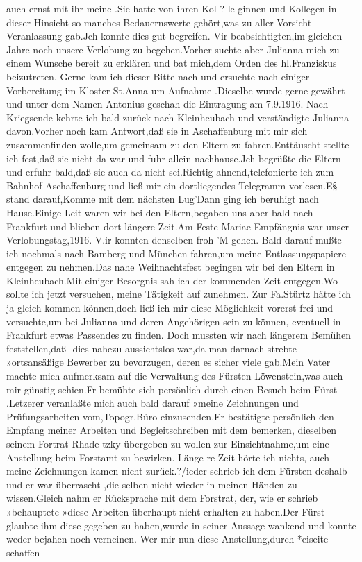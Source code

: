 \documentclass[a4paper,11pt]{article}
\begin{document}
 auch ernst mit ihr meine .Sie hatte von ihren Kol-? le ginnen und Kollegen in dieser Hinsicht so manches Bedauernswerte gehört,was zu aller Vorsicht Veranlassung gab.Jch konnte dies gut begreifen. Vir beabsichtigten,im gleichen Jahre noch unsere Verlobung zu begehen.Vorher suchte aber Julianna mich zu einem Wunsche bereit zu erklären und bat mich,dem Orden des hl.Franziskus beizutreten. Gerne kam ich dieser Bitte nach und ersuchte nach einiger Vorbereitung im Kloster St.Anna um Aufnahme .Dieselbe wurde gerne gewährt und unter dem Namen Antonius geschah die Eintragung am 7.9.1916. Nach Kriegsende kehrte ich bald zurück nach Kleinheubach und verständigte Julianna davon.Vorher noch kam Antwort,daß sie in Aschaffenburg mit mir sich zusammenfinden wolle,um gemeinsam zu den Eltern zu fahren.Enttäuscht stellte ich fest,daß sie nicht da war und fuhr allein nachhause.Jch begrüßte die Eltern und erfuhr bald,daß sie auch da nicht sei.Richtig ahnend,telefonierte ich zum Bahnhof Aschaffenburg und ließ mir ein dortliegendes Telegramm vorlesen.E§ stand darauf,Komme mit dem nächsten Lug'Dann ging ich beruhigt nach Hause.Einige Leit waren wir bei den Eltern,begaben uns aber bald nach Frankfurt und blieben dort längere Zeit.Am Feste Mariae Empfängnis war unser Verlobungstag,1916. V.ir konnten denselben froh 'M gehen. Bald darauf mußte ich nochmals nach Bamberg und München fahren,um meine Entlassungspapiere entgegen zu nehmen.Das nahe Weihnachtsfest begingen wir bei den Eltern in Kleinheubach.Mit einiger Besorgnis sah ich der kommenden Zeit entgegen.Wo sollte ich jetzt versuchen, meine Tätigkeit auf zunehmen. Zur Fa.Stürtz hätte ich ja gleich kommen können,doch ließ ich mir diese Möglichkeit vorerst frei und versuchte,um bei Julianna und deren Angehörigen sein zu können, eventuell in Frankfurt etwas Passendes zu finden. Doch mussten wir nach längerem Bemühen feststellen,daß- dies nahezu aussichtslos war,da man darnach strebte »ortsansäßige Bewerber zu bevorzugen, deren es sicher viele gab.Mein Vater machte mich aufmerksam auf die Verwaltung des Fürsten Löwenstein,was auch mir günstig schien.Fr bemühte sich persönlich durch einen Besuch beim Fürst .Letzerer veranlaßte mich auch bald darauf »meine Zeichnungen und Prüfungsarbeiten vom,Topogr.Büro einzusenden.Er bestätigte persönlich den Empfang meiner Arbeiten und Begleitschreiben mit dem bemerken, dieselben seinem Fortrat Rhade tzky übergeben zu wollen zur Einsichtnahme,um eine Anstellung beim Forstamt zu bewirken. Länge re Zeit hörte ich nichts, auch meine Zeichnungen kamen nicht zurück.?/ieder schrieb ich dem Fürsten deshalb und er war überrascht ,die selben nicht wieder in meinen Händen zu wissen.Gleich nahm er Rücksprache mit dem Forstrat, der, wie er schrieb »behauptete »diese Arbeiten überhaupt nicht erhalten zu haben.Der Fürst glaubte ihm diese gegeben zu haben,wurde in seiner Aussage wankend und konnte weder bejahen noch verneinen. Wer mir nun diese Anstellung,durch *eiseite-schaffen
\end{document}
